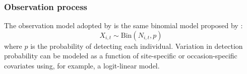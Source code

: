 \documentclass[12pt]{article}
\begin{document}

\subsubsection{Observation process}

The observation model adopted by \citet{dail_madsen:2011} is the same
binomial model proposed by \citet{royle:2004biom}: %
\begin{equation}
  X_{i,t} \sim \mathrm{Bin}(N_{i,t}, p)
  \label{eq:p1}
\end{equation}
where $p$ is the probability of detecting each individual. Variation
in detection probability can be modeled as a function of site-specific
or occasion-specific covariates using, for example, a logit-linear model.

\end{document}
